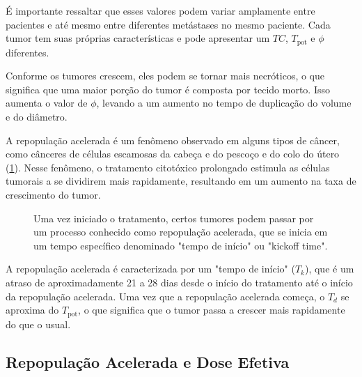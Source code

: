 \documentclass[11pt,a4paper]{article}
\begin{document}
	É importante ressaltar que esses valores podem variar amplamente entre pacientes e até mesmo entre diferentes metástases no mesmo paciente. Cada tumor tem suas próprias características e pode apresentar um $TC$, $T_{\text{pot}}$ e $\phi$ diferentes.

	Conforme os tumores crescem, eles podem se tornar mais necróticos, o que significa que uma maior porção do tumor é composta por tecido morto. Isso aumenta o valor de $\phi$, levando a um aumento no tempo de duplicação do volume e do diâmetro.

	A repopulação acelerada é um fenômeno observado em alguns tipos de câncer, como cânceres de células escamosas da cabeça e do pescoço e do colo do útero (\ref{fig:repopulacaoAcelerada}). Nesse fenômeno, o tratamento citotóxico prolongado estimula as células tumorais a se dividirem mais rapidamente, resultando em um aumento na taxa de crescimento do tumor.

	\begin{figure}[h]
		\centering
		\caption{Uma vez iniciado o tratamento, certos tumores podem passar por um processo conhecido como repopulação acelerada, que se inicia em um tempo específico denominado "tempo de início" ou "kickoff time".}
		\label{fig:repopulacaoAcelerada}
	\end{figure}

	A repopulação acelerada é caracterizada por um "tempo de início" ($T_k$), que é um atraso de aproximadamente 21 a 28 dias desde o início do tratamento até o início da repopulação acelerada. Uma vez que a repopulação acelerada começa, o $T_d$ se aproxima do $T_{\text{pot}}$, o que significa que o tumor passa a crescer mais rapidamente do que o usual.

\subsection*{Repopulação Acelerada e Dose Efetiva}
\end{document}
